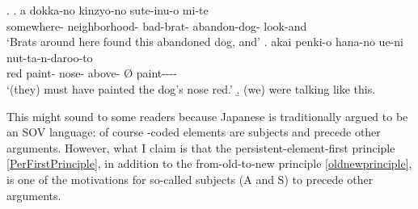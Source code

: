 %
\ex.
 \ag. a dokka-no kinzyo-no  sute-inu-o mi-te \\
		 somewhere- neighborhood- bad-brat- abandon-dog- look-and \\
		`Brats around here found this abandoned dog, and'
 \bg. akai penki-o hana-no ue-ni \EM{\O} nut-ta-n-daroo-to \\
 	red paint- nose- above- {\O} paint---- \\
	`(they) must have painted the dog's nose red.'
 \b. (we) were talking like this.

This might sound  to some readers because Japanese is traditionally argued to be an SOV language:
of course -coded elements are subjects and precede other arguments.
However, what I claim is that
the persistent-element-first principle \ref{PerFirstPrinciple}, in addition to the from-old-to-new principle \ref{oldnewprinciple}, is one of the motivations for so-called subjects (A and S) to precede other arguments.
%

